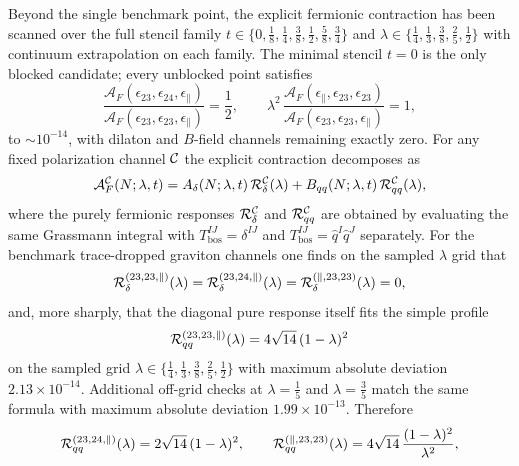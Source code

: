 \documentclass[11pt]{article}
\begin{document}
Beyond the single benchmark point, the explicit fermionic contraction has been scanned over the full stencil family $t \in \{0, \tfrac{1}{8}, \tfrac{1}{4}, \tfrac{3}{8}, \tfrac{1}{2}, \tfrac{5}{8}, \tfrac{3}{4}\}$ and $\lambda \in \{\tfrac{1}{4}, \tfrac{1}{3}, \tfrac{3}{8}, \tfrac{2}{5}, \tfrac{1}{2}\}$ with continuum extrapolation on each family. The minimal stencil $t = 0$ is the only blocked candidate; every unblocked point satisfies
\begin{equation}
\frac{\mathcal{A}_F(\epsilon_{23}, \epsilon_{24}, \epsilon_\parallel)}
{\mathcal{A}_F(\epsilon_{23}, \epsilon_{23}, \epsilon_\parallel)} = \frac{1}{2},
\qquad
\lambda^2\,
\frac{\mathcal{A}_F(\epsilon_\parallel, \epsilon_{23}, \epsilon_{23})}
{\mathcal{A}_F(\epsilon_{23}, \epsilon_{23}, \epsilon_\parallel)} = 1,
\label{eq:channel-relations}
\end{equation}
to $\sim\!10^{-14}$, with dilaton and $B$-field channels remaining exactly zero. For any fixed polarization channel ${\cal C}$ the explicit contraction decomposes as
\begin{equation}
\mathcal{A}_F^{\cal C}(N;\lambda,t)
=
A_\delta(N;\lambda,t)\,{\cal R}^{\cal C}_\delta(\lambda)
+
B_{qq}(N;\lambda,t)\,{\cal R}^{\cal C}_{qq}(\lambda),
\label{eq:ferm-channel-decomp}
\end{equation}
where the purely fermionic responses ${\cal R}^{\cal C}_\delta$ and ${\cal R}^{\cal C}_{qq}$ are obtained by evaluating the same Grassmann integral with $T_{\mathrm{bos}}^{IJ} = \delta^{IJ}$ and $T_{\mathrm{bos}}^{IJ} = \hat q^I\hat q^J$ separately. For the benchmark trace-dropped graviton channels one finds on the sampled $\lambda$ grid that
\begin{equation}
{\cal R}^{(23,23,\parallel)}_\delta(\lambda)
=
{\cal R}^{(23,24,\parallel)}_\delta(\lambda)
=
{\cal R}^{(\parallel,23,23)}_\delta(\lambda)
=
0,
\label{eq:ferm-delta-drop}
\end{equation}
and, more sharply, that the diagonal pure response itself fits the simple
profile
\begin{equation}
{\cal R}^{(23,23,\parallel)}_{qq}(\lambda)
=
4\sqrt{14}\,(1-\lambda)^2
\label{eq:ferm-diag-closed-form}
\end{equation}
on the sampled grid
\(
\lambda\in\{\frac14,\frac13,\frac38,\frac25,\frac12\}
\)
with maximum absolute deviation $2.13\times 10^{-14}$. Additional off-grid
checks at $\lambda=\frac15$ and $\lambda=\frac35$ match the same formula with
maximum absolute deviation $1.99\times 10^{-13}$. Therefore
\begin{equation}
{\cal R}^{(23,24,\parallel)}_{qq}(\lambda)
=
2\sqrt{14}\,(1-\lambda)^2,
\qquad
{\cal R}^{(\parallel,23,23)}_{qq}(\lambda)
=
4\sqrt{14}\,\frac{(1-\lambda)^2}{\lambda^2},
\label{eq:ferm-response-closed-family}
\end{equation}
\end{document}

